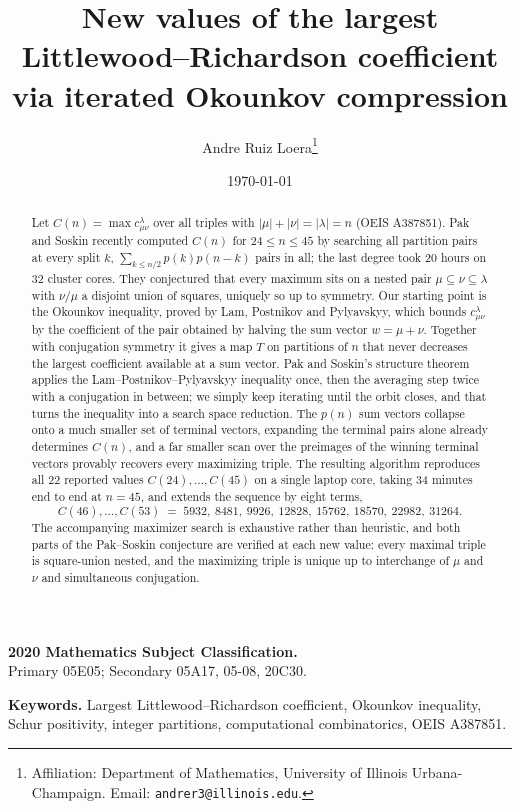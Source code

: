 \documentclass[11pt]{article}
\title{New values of the largest Littlewood--Richardson coefficient\\
via iterated Okounkov compression}
\author{Andre Ruiz Loera\thanks{Affiliation: Department of Mathematics, University of Illinois Urbana-Champaign. Email: \texttt{andrer3@illinois.edu}.}}
\date{\today}
\theoremstyle{remark}
\newcommand{\lam}{\lambda}
\begin{document}
\maketitle

\begin{abstract}
Let $C(n)=\max c^{\lam}_{\mu\nu}$ over all triples with $|\mu|+|\nu|=|\lam|=n$
(OEIS A387851). Pak and Soskin recently computed $C(n)$ for $24\le n\le 45$ by searching
all partition pairs at every split $k$,
$\sum_{k\le n/2}p(k)p(n-k)$ pairs in all; the last degree took 20 hours on 32
cluster cores. They conjectured that every maximum sits on a nested pair
$\mu\subseteq\nu\subseteq\lam$ with $\nu/\mu$ a disjoint union of squares, uniquely so up
to symmetry. Our starting point is the Okounkov inequality, proved
by Lam, Postnikov and Pylyavskyy, which bounds $c^{\lam}_{\mu\nu}$ by the coefficient of
the pair obtained by halving
the sum vector $w=\mu+\nu$. Together with conjugation symmetry it gives a map $T$ on
partitions of $n$ that never decreases the largest coefficient available at a sum vector.
Pak and Soskin's structure theorem applies the Lam--Postnikov--Pylyavskyy inequality
once, then the averaging step twice with a conjugation in between; we simply keep
iterating until the orbit closes, and that turns the inequality into a search space
reduction. The $p(n)$ sum vectors collapse onto a much smaller set of terminal vectors,
expanding the terminal pairs alone already determines $C(n)$, and a far
smaller scan over the preimages of the winning terminal vectors provably recovers every
maximizing triple. The resulting
algorithm reproduces all 22 reported values $C(24),\dots,C(45)$ on a single laptop
core, taking 34 minutes end to end at $n=45$, and extends the sequence by eight terms,
\[
C(46),\dots,C(53) \;=\; 5932,\ 8481,\ 9926,\ 12828,\ 15762,\ 18570,\ 22982,\ 31264 .
\]
The accompanying maximizer search is exhaustive rather than heuristic, and both parts of
the Pak--Soskin conjecture are verified at each new value: every maximal triple is
square-union nested, and the maximizing triple is unique up to interchange of $\mu$ and
$\nu$ and simultaneous conjugation.
\end{abstract}

\smallskip
\noindent\textbf{2020 Mathematics Subject Classification.}\\
Primary 05E05; Secondary 05A17, 05-08, 20C30.

\smallskip
\noindent\textbf{Keywords.}
Largest Littlewood--Richardson coefficient, Okounkov inequality, Schur positivity,
integer partitions, computational combinatorics, OEIS A387851.
\end{document}
